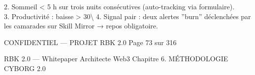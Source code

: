 2. Sommeil \textless{} 5 h sur trois nuits consécutives (auto-tracking via formulaire).\\
3. Productivité : baisse \textgreater{} 30\textbackslash{}%
4. Signal pair : deux alertes ”burn” déclenchées par les camarades sur Skill Mirror → repos obligatoire.\\
\vspace{0.5em}
\vspace{0.5em}
\vspace{0.5em}
\vspace{0.5em}
\begin{confidential}CONFIDENTIEL — PROJET RBK 2.0                                            Page 73 sur 316\end{confidential}
RBK 2.0 — Whitepaper Architecte Web3                                                                             Chapitre 6. MÉTHODOLOGIE CYBORG 2.0\\
\vspace{0.5em}
\vspace{0.5em}
